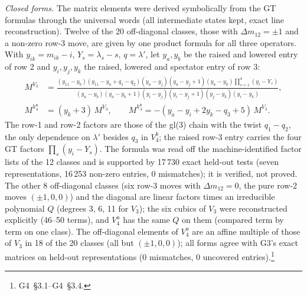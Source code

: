 \documentclass[11pt]{article}
\makeatletter
\renewcommand\subsection{\@startsection{subsection}{2}{\z@}{-2.0ex \@plus -1ex \@minus -.2ex}{0.6ex \@plus .2ex}{\normalfont\normalsize\bfseries}}
\newcommand{\rg}[2]{\textsf{G#1}~\S#2}
\makeatother
\begin{document}
\emph{Closed forms.} The matrix elements were derived symbolically from the GT formulas through the universal words (all intermediate states kept, exact line reconstruction).
Twelve of the 20 off-diagonal classes, those with $\Delta m_{12}=\pm1$ and a non-zero row-3 move, are given by one product formula for all three operators.
With $y_{ik}=m_{ik}-i$, $Y_s=\lambda_s-s$, $q=\lambda'$, let $y_a,y_b$ be the raised and lowered entry of row 2 and $y_i,y_j,y_k$ the raised, lowered and spectator entry of row 3:
\begin{equation}\label{eq:univ}
\begin{aligned}
M^{V_3}&=\frac{(y_{11}-y_b)(y_{11}-y_a+q_1-q_2)(y_a-y_j)(y_a-y_j+1)(y_a-y_k)\prod_{s=1}^4(y_i-Y_s)}{(y_a-y_b)(y_a-y_b+1)(y_i-y_j)(y_i-y_j+1)(y_j-y_k)(y_i-y_k)},\\
M^{V_4^a}&=(y_k+3)\,M^{V_3},\qquad M^{V_4^b}=-(y_a-y_i+2y_k-q_3+5)\,M^{V_3}.
\end{aligned}
\end{equation}
The row-1 and row-2 factors are those of the gl(3) chain with the twist $q_1-q_2$, the only dependence on $\lambda'$ besides $q_3$ in $V_4^b$; the raised row-3 entry carries the four GT factors $\prod_s(y_i-Y_s)$.
The formula was read off the machine-identified factor lists of the 12 classes and is supported by 17\,730 exact held-out tests (seven representations, 16\,253 non-zero entries, 0 mismatches); it is verified, not proved.
The other 8 off-diagonal classes (six row-3 moves with $\Delta m_{12}=0$, the pure row-2 moves $(\pm1,0,0)$) and the diagonal are linear factors times an irreducible polynomial $Q$ (degrees 3, 6, 11 for $V_3$); the six cubics of $V_3$ were reconstructed explicitly (46--50 terms), and $V_4^a$ has the same $Q$ on them (compared term by term on one class).
The off-diagonal elements of $V_4^a$ are an affine multiple of those of $V_3$ in 18 of the 20 classes (all but $(\pm1,0,0)$); all forms agree with G3's exact matrices on held-out representations (0 mismatches, 0 uncovered entries).\footnote{\rg{4}{3.1}--\rg{4}{3.4}.}

\subsection{The Weyl/BGG identity}\label{sec:weyl}
\end{document}
